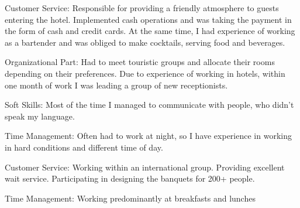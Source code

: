 \documentclass[]{deedy-resume-openfont}
\begin{document}
\begin{minipage}[t]{0.66\textwidth}
\vspace{\topsep} %
\begin{tightemize}
\item Customer Service: Responsible for providing a friendly atmosphere to guests entering the hotel. Implemented cash operations and was taking the payment in the form of cash and credit cards. At the same time, I had
experience of working as a bartender and was obliged to make cocktails, serving food and beverages.
\item Organizational Part: Had to meet touristic groups and allocate their rooms depending on their preferences. Due to experience of working in hotels, within one month of work I was leading a group of new receptionists.
\item Soft Skills: Most of the time I managed to communicate with people, who didn’t speak my language.
\item Time Management: Often had to work at night, so I have experience in working in hard conditions and different time of day.
\end{tightemize}
\sectionsep

\vspace{\topsep} %
\begin{tightemize}
\item Customer Service: Working within an international group. Providing excellent wait service. Participating in designing the banquets for 200+ people.
\item Time Management: Working predominantly at breakfasts and lunches
\end{tightemize}
\sectionsep






%
%


\end{minipage}
\end{document}
